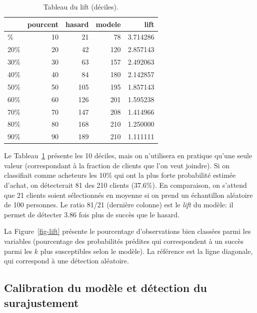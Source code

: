 \documentclass[
  11pt,
  letterpaper,
]{scrbook}
\theoremstyle{definition}
\theoremstyle{remark}
\begin{document}
\begin{longtable}[]{@{}lrrrr@{}}

\caption{\label{tbl-lift}Tableau du lift (déciles).}

\tabularnewline

\toprule\noalign{}
& pourcent & hasard & modele & lift \\
\midrule\noalign{}
\endhead
\bottomrule\noalign{}
\endlastfoot
10\% & 10 & 21 & 78 & 3.714286 \\
20\% & 20 & 42 & 120 & 2.857143 \\
30\% & 30 & 63 & 157 & 2.492063 \\
40\% & 40 & 84 & 180 & 2.142857 \\
50\% & 50 & 105 & 195 & 1.857143 \\
60\% & 60 & 126 & 201 & 1.595238 \\
70\% & 70 & 147 & 208 & 1.414966 \\
80\% & 80 & 168 & 210 & 1.250000 \\
90\% & 90 & 189 & 210 & 1.111111 \\

\end{longtable}

Le Tableau~\ref{tbl-lift} présente les 10 déciles, mais on n'utilisera
en pratique qu'une seule valeur (correspondant à la fraction de clients
que l'on veut joindre). Si on classifiait comme acheteurs les 10\% qui
ont la plus forte probabilité estimée d'achat, on détecterait 81 des 210
clients (37.6\%). En comparaison, on s'attend que 21 clients soient
sélectionnés en moyenne si on prend un échantillon aléatoire de 100
personnes. Le ratio 81/21 (dernière colonne) est le \emph{lift} du
modèle: il permet de détecter 3.86 fois plus de succès que le hasard.

La Figure~\ref{fig-lift} présente le pourcentage d'observations bien
classées parmi les variables (pourcentage des probabilités prédites qui
correspondent à un succès parmi les \(k\) plus susceptibles selon le
modèle). La référence est la ligne diagonale, qui correspond à une
détection aléatoire.

\subsection{Calibration du modèle et détection du
surajustement}\label{calibration-du-moduxe8le-et-duxe9tection-du-surajustement}
\end{document}
